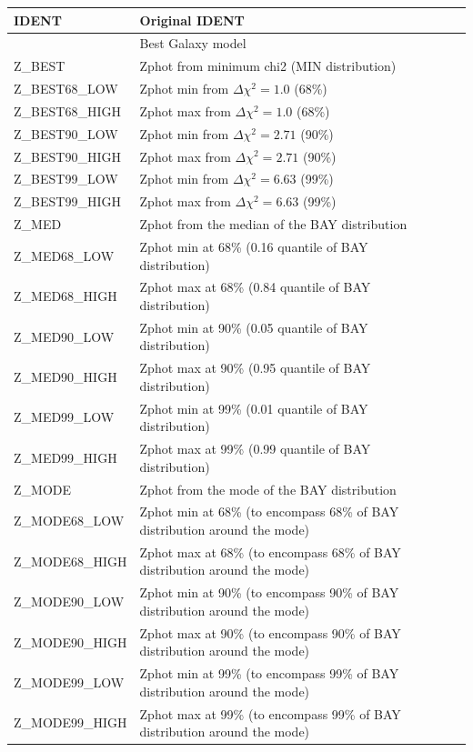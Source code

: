 \documentclass[12pt]{article}
\begin{document}
\label{sec:outp}
\begin{tabular}{llll}
\hline
\hline
IDENT                        &    Original IDENT       \\   
\hline 
         &    Best Galaxy model  \\  
\hline
Z\_BEST            &    Zphot from minimum chi2 (MIN distribution)    \\
Z\_BEST68\_LOW     &    Zphot min  from   $\Delta \chi^2=1.0$   (68\%) \\
Z\_BEST68\_HIGH    &    Zphot max  from  $\Delta \chi^2=1.0$   (68\%)\\
Z\_BEST90\_LOW     &    Zphot min  from   $\Delta \chi^2=2.71$ (90\%)\\
Z\_BEST90\_HIGH    &    Zphot max  from  $\Delta \chi^2=2.71$ (90\%) \\  
Z\_BEST99\_LOW     &    Zphot min  from   $\Delta \chi^2=6.63$ (99\%)  \\
Z\_BEST99\_HIGH    &    Zphot max  from  $\Delta \chi^2=6.63$ (99\%)   \\ 
Z\_MED             &  Zphot from the median of the BAY distribution \\
Z\_MED68\_LOW     &   Zphot min at 68\% (0.16 quantile of BAY distribution)  \\ 
Z\_MED68\_HIGH    &   Zphot max at 68\% (0.84 quantile of BAY distribution)  \\ 
Z\_MED90\_LOW     &   Zphot min at 90\% (0.05 quantile of BAY distribution) \\ 
Z\_MED90\_HIGH    &   Zphot max at 90\% (0.95 quantile of BAY distribution)  \\ 
Z\_MED99\_LOW     &   Zphot min at 99\% (0.01 quantile of BAY distribution)  \\ 
Z\_MED99\_HIGH    &   Zphot max at 99\% (0.99 quantile of BAY distribution)  \\ 
Z\_MODE           &   Zphot from the mode of the BAY distribution \\
Z\_MODE68\_LOW    &   Zphot min at 68\% (to encompass 68\% of BAY distribution around the mode)  \\ 
Z\_MODE68\_HIGH   &   Zphot max at 68\% (to encompass 68\% of BAY distribution around the mode)  \\ 
Z\_MODE90\_LOW    &   Zphot min at 90\% (to encompass 90\% of BAY distribution around the mode) \\ 
Z\_MODE90\_HIGH   &   Zphot max at 90\% (to encompass 90\% of BAY distribution around the mode)  \\ 
Z\_MODE99\_LOW    &   Zphot min at 99\% (to encompass 99\% of BAY distribution around the mode)  \\ 
Z\_MODE99\_HIGH   &   Zphot max at 99\% (to encompass 99\% of BAY distribution around the mode)  \\ 



\end{tabular}
\end{document}
